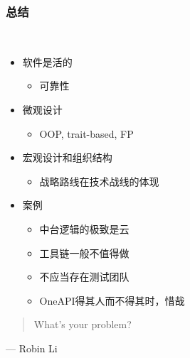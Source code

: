 \documentclass[UTF8,lualatex]{ctexbeamer}
\newcommand{\pagequote}[2]{
  \Large
  \begin{quotation}
      #1
  \end{quotation}
  \flushright\normalsize --- {#2}
}
\begin{document}
\begin{frame}
    \frametitle{总结}
    \begin{block}{~}
        \begin{itemize}
            \item 软件是活的
                \begin{itemize}
                    \item 可靠性
                \end{itemize}
            \item 微观设计
                \begin{itemize}
                    \item OOP, trait-based, FP
                \end{itemize}
            \item 宏观设计和组织结构
                \begin{itemize}
                    \item 战略路线在技术战线的体现
                \end{itemize}
            \item 案例
                \begin{itemize}
                    \item 中台逻辑的极致是云
                    \item 工具链一般不值得做
                    \item 不应当存在测试团队
                    \item OneAPI得其人而不得其时，惜哉
                \end{itemize}
        \end{itemize}
    \end{block}
\end{frame}

\begin{frame}
    \pagequote{What's your problem?}{Robin Li}
\end{frame}
\end{document}
